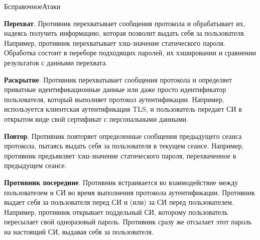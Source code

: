 \begin{appendix}{Б}{справочное}{Атаки}

{\bf Перехват}. 
Противник перехватывает сообщения протокола и обрабатывает их,
надеясь получить информацию, которая позволит выдать себя за пользователя. 
Например, противник перехватывает хэш-значение статического пароля.
Обработка состоит в переборе подходящих паролей, их хэшировании и 
сравнении результатов с данными перехвата. 


{\bf Раскрытие}. 
Противник перехватывает сообщения протокола и 
определяет приватные идентификационные данные или даже просто 
идентификатор пользователя, который выполняет протокол аутентификации.
% 
Например, используется клиентская аутентификация TLS, 
и пользователь передает СИ в открытом виде
свой сертификат с персональными данными.


{\bf Повтор}. 
Противник повторяет определенные сообщения предыдущего сеанса протокола,
пытаясь выдать себя за пользователя в текущем сеансе. 
%
Например, противник предъявляет хэш-значение статического пароля,
перехваченное в предыдущем сеансе.


{\bf Противник посередине}. 
Противник встраивается во взаимодействие между пользователем и СИ во время
выполнения протокола аутентификации. Противник выдает себя 
за пользователя перед СИ и (или) за СИ перед пользователем. 
Например, противник открывает поддельный СИ, которому пользователь 
пересылает свой одноразовый пароль. Противник сразу же отсылает
этот пароль на настоящий СИ, выдавая себя за пользователя.



\end{appendix}
